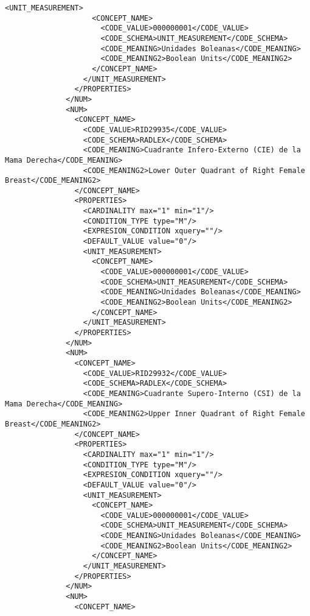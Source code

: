 \begin{lstlisting}[label=some-code,caption=Some Code]
                  <UNIT_MEASUREMENT>
                    <CONCEPT_NAME>
                      <CODE_VALUE>000000001</CODE_VALUE>
                      <CODE_SCHEMA>UNIT_MEASUREMENT</CODE_SCHEMA>
                      <CODE_MEANING>Unidades Boleanas</CODE_MEANING>
                      <CODE_MEANING2>Boolean Units</CODE_MEANING2>
                    </CONCEPT_NAME>
                  </UNIT_MEASUREMENT>
                </PROPERTIES>
              </NUM>
              <NUM>
                <CONCEPT_NAME>
                  <CODE_VALUE>RID29935</CODE_VALUE>
                  <CODE_SCHEMA>RADLEX</CODE_SCHEMA>
                  <CODE_MEANING>Cuadrante Infero-Externo (CIE) de la Mama Derecha</CODE_MEANING>
                  <CODE_MEANING2>Lower Outer Quadrant of Right Female Breast</CODE_MEANING2>
                </CONCEPT_NAME>
                <PROPERTIES>
                  <CARDINALITY max="1" min="1"/>
                  <CONDITION_TYPE type="M"/>
                  <EXPRESION_CONDITION xquery=""/>
                  <DEFAULT_VALUE value="0"/>
                  <UNIT_MEASUREMENT>
                    <CONCEPT_NAME>
                      <CODE_VALUE>000000001</CODE_VALUE>
                      <CODE_SCHEMA>UNIT_MEASUREMENT</CODE_SCHEMA>
                      <CODE_MEANING>Unidades Boleanas</CODE_MEANING>
                      <CODE_MEANING2>Boolean Units</CODE_MEANING2>
                    </CONCEPT_NAME>
                  </UNIT_MEASUREMENT>
                </PROPERTIES>
              </NUM>
              <NUM>
                <CONCEPT_NAME>
                  <CODE_VALUE>RID29932</CODE_VALUE>
                  <CODE_SCHEMA>RADLEX</CODE_SCHEMA>
                  <CODE_MEANING>Cuadrante Supero-Interno (CSI) de la Mama Derecha</CODE_MEANING>
                  <CODE_MEANING2>Upper Inner Quadrant of Right Female Breast</CODE_MEANING2>
                </CONCEPT_NAME>
                <PROPERTIES>
                  <CARDINALITY max="1" min="1"/>
                  <CONDITION_TYPE type="M"/>
                  <EXPRESION_CONDITION xquery=""/>
                  <DEFAULT_VALUE value="0"/>
                  <UNIT_MEASUREMENT>
                    <CONCEPT_NAME>
                      <CODE_VALUE>000000001</CODE_VALUE>
                      <CODE_SCHEMA>UNIT_MEASUREMENT</CODE_SCHEMA>
                      <CODE_MEANING>Unidades Boleanas</CODE_MEANING>
                      <CODE_MEANING2>Boolean Units</CODE_MEANING2>
                    </CONCEPT_NAME>
                  </UNIT_MEASUREMENT>
                </PROPERTIES>
              </NUM>
              <NUM>
                <CONCEPT_NAME>

\end{lstlisting}
